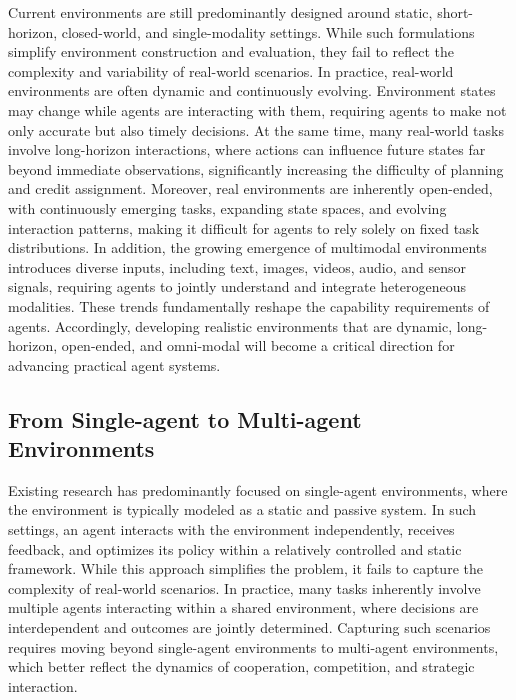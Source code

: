 Current environments are still predominantly designed around static, short-horizon, closed-world, and single-modality settings.
While such formulations simplify environment construction and evaluation, they fail to reflect the complexity and variability of real-world scenarios.
In practice, real-world environments are often dynamic and continuously evolving.
Environment states may change while agents are interacting with them, requiring agents to make not only accurate but also timely decisions.
At the same time, many real-world tasks involve long-horizon interactions, where actions can influence future states far beyond immediate observations, significantly increasing the difficulty of planning and credit assignment.
Moreover, real environments are inherently open-ended, with continuously emerging tasks, expanding state spaces, and evolving interaction patterns, making it difficult for agents to rely solely on fixed task distributions.
In addition, the growing emergence of multimodal environments introduces diverse inputs, including text, images, videos, audio, and sensor signals, requiring agents to jointly understand and integrate heterogeneous modalities.
These trends fundamentally reshape the capability requirements of agents.
Accordingly, developing realistic environments that are dynamic, long-horizon, open-ended, and omni-modal will become a critical direction for advancing practical agent systems.

\subsection{From Single-agent to Multi-agent Environments}

Existing research has predominantly focused on single-agent environments, where the environment is typically modeled as a static and passive system. 
In such settings, an agent interacts with the environment independently, receives feedback, and optimizes its policy within a relatively controlled and static framework.
While this approach simplifies the problem, it fails to capture the complexity of real-world scenarios.
In practice, many tasks inherently involve multiple agents interacting within a shared environment, where decisions are interdependent and outcomes are jointly determined. Capturing such scenarios requires moving beyond single-agent environments to multi-agent environments, which better reflect the dynamics of cooperation, competition, and strategic interaction.

